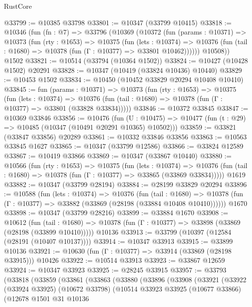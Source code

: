 \begin{lexlean}{RustCore}
\begin{coremodule}
@33799 := @10385 @33798
@33801 := @10347 (@33799 @10415)
@33818 := @10346
    (fun (fn : @7) =>
    @33796
      (@10369
        (@10372
          (fun (params : @10371) =>
          @10373
            (fun (rty : @1653) =>
            @10375
              (fun (lets : @10374) =>
              @10376 (fun (tail : @1680) => @10378 (fun (Γ : @10377) => @33801 @10462))))))
        @10508))
    @1502
@33821 := @10514 (@33794 (@10364 @1502))
@33824 := @10427 (@10428 @1502) @20291
@33828 := @10347 (@10419 (@33824 @10436) @10440)
@33829 := @10453 @1502
@33834 := @10450 (@10452 @33829 @20294 @10408 @10410)
@33845 := fun (params : @10371) =>
  @10373
    (fun (rty : @1653) =>
    @10375
      (fun (lets : @10374) =>
      @10376 (fun (tail : @1680) => @10378 (fun (Γ : @10377) => @33801 (@33828 @33834)))))
@33846 := @10372 @33845
@33847 := @10369 @33846
@33856 := @10476
    (fun (U : @10475) => @10477 (fun (t : @29) => @10485 (@10347 (@10491 @20291 @10365) @10502)))
@33859 := @33821 (@33847 @33856) @20289
@33861 := @10332 @33846 @33856
@33863 := @10563 @33845 @1627
@33865 := @10347 (@33799 @12586)
@33866 := @33824 @12589
@33867 := @10419 @33866
@33869 := @10347 (@33867 @10440)
@33880 := @10566
    (fun (rty : @1653) =>
    @10375
      (fun (lets : @10374) =>
      @10376 (fun (tail : @1680) => @10378 (fun (Γ : @10377) => @33865 (@33869 @33834)))))
    @1619
@33882 := @10347 (@33799 @28194)
@33884 := @28199 @33829 @20294
@33896 := @10588
    (fun (lets : @10374) =>
    @10376
      (fun (tail : @1680) =>
      @10378 (fun (Γ : @10377) => @33882 (@33869 (@28198 (@33884 @10408 @10410))))))
    @1670
@33898 := @10347 (@33799 @28216)
@33899 := @33884 @1670
@33908 := @10612
    (fun (tail : @1680) => @10378 (fun (Γ : @10377) => @33898 (@33869 (@28198 (@33899 @10410)))))
    @10136
@33913 := @33799 (@10397 (@12584 (@28191 (@10407 @10137))))
@33914 := @10347 @33913
@33915 := @33899 @10136
@33921 := @10630 (fun (Γ : @10377) => @33914 (@33869 (@28198 @33915))) @10426
@33922 := @10514 @33913
@33923 := @33867 @12659
@33924 := @10347 @33923
@33925 := @28245 @33915
@33957 := @33793
    (@33818
      (@33859
        (@33861
          (@33863
            (@33880
              (@33896
                (@33908
                  (@33921
                    (@33922
                      (@33924 @33925)
                      (@10672 @33798)
                      (@10514
                        @33923
                        @33925
                        (@10677 @33866)
                        (@12678
                          @1501
                          @31
                          @10136

\end{coremodule}
\end{lexlean}
